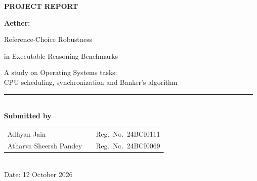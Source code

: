 \documentclass[11pt,a4paper]{article}
\begin{document}
\begin{titlepage}
\centering
\vspace*{1.2cm}
{\large\bfseries\color{accent} PROJECT REPORT}\\[1.2cm]
{\fontsize{24}{30}\selectfont\bfseries\color{accent} Aether:\par Reference-Choice Robustness\par in Executable Reasoning Benchmarks\par}\vspace{0.6cm}
{\large A study on Operating Systems tasks:\\CPU scheduling, synchronization and Banker's algorithm}\\[1.8cm]
\rule{0.5\linewidth}{0.6pt}\\[0.8cm]
{\large\textbf{Submitted by}}\\[6pt]
\begin{tabular}{lll}
Adhyan Jain & \quad & Reg.\ No.\ 24BCI0111\\
Atharva Sheersh Pandey & \quad & Reg.\ No.\ 24BCI0069
\end{tabular}\\[1.2cm]
Date: 12 October 2026
\vfill
\end{titlepage}

\end{document}
